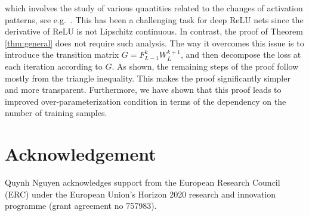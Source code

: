 \documentclass{article}
\begin{document}
which involves the study of various quantities related to the changes of activation patterns,
see e.g.\ \cite{AllenZhuEtal2018, ZouGu2019, OymakMahdi2019, SongYang2020, DuEtal2018_ICLR, arora2019fine}.
This has been a challenging task for deep ReLU nets since the derivative of ReLU is not Lipschitz continuous.
In contrast, the proof of Theorem \ref{thm:general} does not require such analysis.
The way it overcomes this issue is to introduce the transition matrix $G=F_{L-1}^k W_L^{k+1}$,
and then decompose the loss at each iteration according to $G$. 
As shown, the remaining steps of the proof follow mostly from the triangle inequality.
This makes the proof significantly simpler and more transparent.
Furthermore, we have shown that this proof leads to improved over-parameterization condition in terms of the dependency on the number of training samples.

\section*{Acknowledgement}
Quynh Nguyen acknowledges support from the European Research Council (ERC) under the European Union’s Horizon 2020 research 
and innovation programme (grant agreement no 757983).



\end{document}
